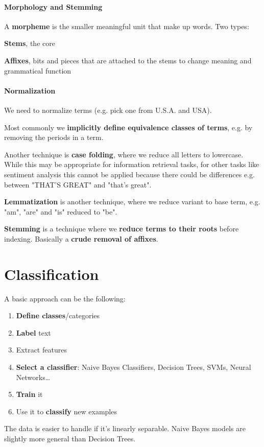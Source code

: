 \documentclass[10pt]{report}
\begin{document}
\paragraph{Morphology and Stemming} A \textbf{morpheme} is the smaller meaningful unit that make up words. Two types:
\begin{list}{}{}
	\item \textbf{Stems}, the core
	\item \textbf{Affixes}, bits and pieces that are attached to the stems to change meaning and grammatical function
\end{list}
\paragraph{Normalization} We need to normalize terms (e.g. pick one from U.S.A. and USA). \begin{list}{}{}
	\item Most commonly we \textbf{implicitly define equivalence classes of terms}, e.g. by removing the periods in a term.
	\item Another technique is \textbf{case folding}, where we reduce all letters to lowercase. While this may be appropriate for information retrieval tasks, for other tasks like sentiment analysis this cannot be applied because there could be differences e.g. between "THAT'S GREAT" and "that's great".
	\item \textbf{Lemmatization} is another technique, where we reduce variant to base term, e.g. "am", "are" and "is" reduced to "be".
	\item
\textbf{Stemming} is a technique where we \textbf{reduce terms to their roots} before indexing. Basically a \textbf{crude removal of affixes}.
\end{list}
\section{Classification}
A basic approach can be the following:
\begin{enumerate}
	\item \textbf{Define classes}/categories
	\item \textbf{Label} text
	\item Extract features
	\item \textbf{Select a classifier}: Naive Bayes Classifiers, Decision Trees, SVMs, Neural Networks\ldots
	\item \textbf{Train} it
	\item Use it to \textbf{classify} new examples
\end{enumerate}
The data is easier to handle if it's linearly separable. Naive Bayes models are slightly more general than Decision Trees.
\end{document}
